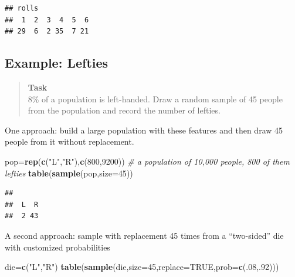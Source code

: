 \documentclass[
]{book}
\newenvironment{Shaded}{\begin{snugshade}}{\end{snugshade}}
\newcommand{\AttributeTok}[1]{\textcolor[rgb]{0.13,0.29,0.53}{#1}}
\newcommand{\CommentTok}[1]{\textcolor[rgb]{0.56,0.35,0.01}{\textit{#1}}}
\newcommand{\ConstantTok}[1]{\textcolor[rgb]{0.56,0.35,0.01}{#1}}
\newcommand{\DecValTok}[1]{\textcolor[rgb]{0.00,0.00,0.81}{#1}}
\newcommand{\FunctionTok}[1]{\textcolor[rgb]{0.13,0.29,0.53}{\textbf{#1}}}
\newcommand{\NormalTok}[1]{#1}
\newcommand{\OtherTok}[1]{\textcolor[rgb]{0.56,0.35,0.01}{#1}}
\newcommand{\StringTok}[1]{\textcolor[rgb]{0.31,0.60,0.02}{#1}}
\theoremstyle{definition}
\theoremstyle{definition}
\theoremstyle{definition}
\theoremstyle{definition}
\theoremstyle{remark}
\begin{document}
\begin{verbatim}
## rolls
##  1  2  3  4  5  6 
## 29  6  2 35  7 21
\end{verbatim}

\subsection*{Example: Lefties}\label{example-lefties}

\begin{quote}
\textbf{Task}\\
8\% of a population is left-handed. Draw a random sample of 45 people from the population and record the number of lefties.
\end{quote}

One approach: build a large population with these features and then draw 45 people from it without replacement.

\begin{Shaded}
\begin{Highlighting}[]
\NormalTok{pop}\OtherTok{=}\FunctionTok{rep}\NormalTok{(}\FunctionTok{c}\NormalTok{(}\StringTok{"L"}\NormalTok{,}\StringTok{"R"}\NormalTok{),}\FunctionTok{c}\NormalTok{(}\DecValTok{800}\NormalTok{,}\DecValTok{9200}\NormalTok{)) }\CommentTok{\# a population of 10,000 people, 800 of them lefties}
\FunctionTok{table}\NormalTok{(}\FunctionTok{sample}\NormalTok{(pop,}\AttributeTok{size=}\DecValTok{45}\NormalTok{)) }
\end{Highlighting}
\end{Shaded}

\begin{verbatim}
## 
##  L  R 
##  2 43
\end{verbatim}

A second approach: sample with replacement 45 times from a ``two-sided'' die with customized probabilities

\begin{Shaded}
\begin{Highlighting}[]
\NormalTok{die}\OtherTok{=}\FunctionTok{c}\NormalTok{(}\StringTok{"L"}\NormalTok{,}\StringTok{"R"}\NormalTok{)}
\FunctionTok{table}\NormalTok{(}\FunctionTok{sample}\NormalTok{(die,}\AttributeTok{size=}\DecValTok{45}\NormalTok{,}\AttributeTok{replace=}\ConstantTok{TRUE}\NormalTok{,}\AttributeTok{prob=}\FunctionTok{c}\NormalTok{(.}\DecValTok{08}\NormalTok{,.}\DecValTok{92}\NormalTok{)))}
\end{Highlighting}
\end{Shaded}
\end{document}
